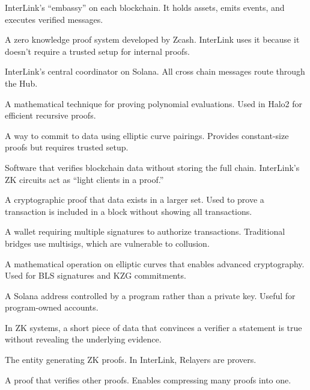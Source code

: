 \documentclass[11pt,a4paper]{article}
\begin{document}
\begin{description}[style=nextline, leftmargin=3cm, labelwidth=2.8cm]
\item[Gateway Contract] InterLink's ``embassy'' on each blockchain. It holds assets, emits events, and executes verified messages.

\item[Halo2] A zero knowledge proof system developed by Zcash. InterLink uses it because it doesn't require a trusted setup for internal proofs.

\item[Hub] InterLink's central coordinator on Solana. All cross chain messages route through the Hub.

\item[IPA (Inner Product Argument)] A mathematical technique for proving polynomial evaluations. Used in Halo2 for efficient recursive proofs.

\item[KZG Commitment] A way to commit to data using elliptic curve pairings. Provides constant-size proofs but requires trusted setup.

\item[Light Client] Software that verifies blockchain data without storing the full chain. InterLink's ZK circuits act as ``light clients in a proof.''

\item[Merkle Proof] A cryptographic proof that data exists in a larger set. Used to prove a transaction is included in a block without showing all transactions.

\item[Multisig] A wallet requiring multiple signatures to authorize transactions. Traditional bridges use multisigs, which are vulnerable to collusion.

\item[Pairing] A mathematical operation on elliptic curves that enables advanced cryptography. Used for BLS signatures and KZG commitments.

\item[PDA (Program Derived Address)] A Solana address controlled by a program rather than a private key. Useful for program-owned accounts.

\item[Proof] In ZK systems, a short piece of data that convinces a verifier a statement is true without revealing the underlying evidence.

\item[Prover] The entity generating ZK proofs. In InterLink, Relayers are provers.

\item[Recursion] A proof that verifies other proofs. Enables compressing many proofs into one.


\end{description}
\end{document}
